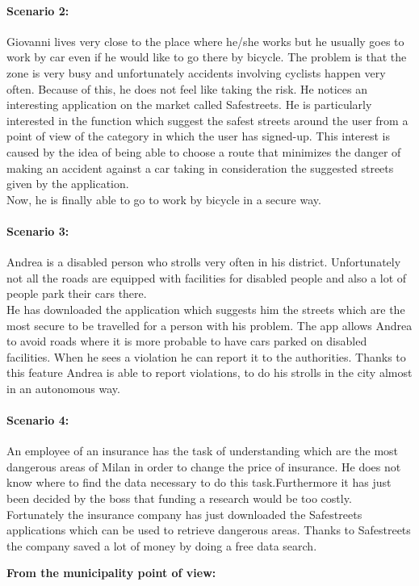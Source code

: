 \documentclass[titlepage]{article}
\begin{document}
\paragraph{Scenario 2:}Giovanni lives very close to the place where he/she works but he usually goes to work by car even if he would like to go there by bicycle. The problem is that the zone is very busy and unfortunately accidents involving cyclists happen very often. Because of this, he does not feel like taking the risk.
He notices an interesting application on the market called Safestreets. He is particularly interested in the function which suggest the safest streets around the user from a point of view of the category in which the user has signed-up. This interest is caused by the idea of ​​being able to choose a route that minimizes the danger of making an accident against a car taking in consideration the suggested streets given by the application.\\
Now, he is finally able to go to work by bicycle in a secure way.
\paragraph{Scenario 3:}Andrea is a disabled person who strolls very often in his district. Unfortunately not all the roads are equipped with facilities for disabled people and also a lot of people park their cars there.\\
He has downloaded the application which suggests him the streets which are the most secure to be travelled for a person with his problem. The app allows Andrea to avoid roads where it is more probable to have cars parked on disabled facilities. When he sees a violation he can report it to the authorities. Thanks to this feature Andrea is able to report violations, to do his strolls in the city almost in an autonomous way. 
\paragraph{Scenario 4:} An employee of an insurance has the task of understanding which are the most dangerous areas of Milan in order to change the price of insurance. He does not know where to find the data necessary to do this task.Furthermore it has just been decided by the boss that funding a research would be too costly.\\
Fortunately the insurance company has just downloaded the Safestreets applications which can be used to retrieve dangerous areas. Thanks to Safestreets the company saved a lot of money by doing a free data search.\newpage
\begin{center}
	\textbf{From the municipality point of view:}
\end{center}
\end{document}
